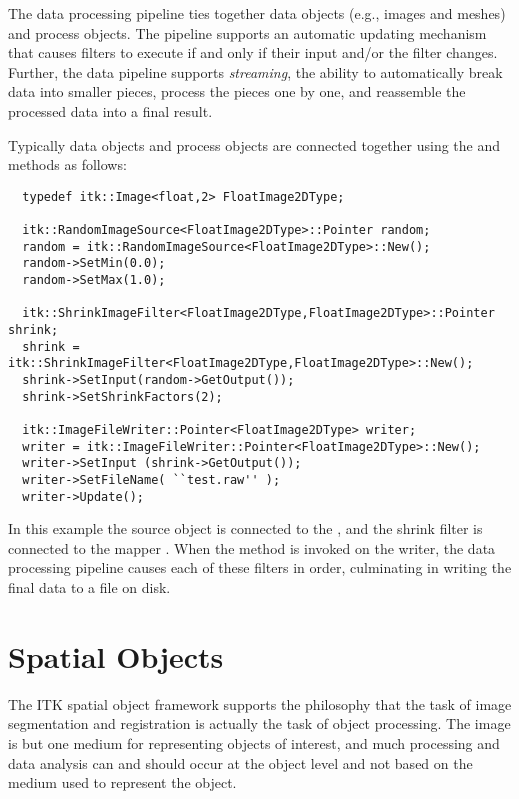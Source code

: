 
The data processing pipeline ties together data objects (e.g., images and
meshes) and process objects. The pipeline supports an automatic updating
mechanism that causes filters to execute if and only if their input 
and/or the filter changes. Further, the data pipeline supports
\emph{streaming}, the ability to automatically break data into smaller
pieces, process the pieces one by one, and reassemble the processed data into
a final result.

Typically data objects and process objects are connected together using the
 and  methods as follows:

\small
\begin{verbatim}
  typedef itk::Image<float,2> FloatImage2DType;

  itk::RandomImageSource<FloatImage2DType>::Pointer random;
  random = itk::RandomImageSource<FloatImage2DType>::New();
  random->SetMin(0.0);
  random->SetMax(1.0);

  itk::ShrinkImageFilter<FloatImage2DType,FloatImage2DType>::Pointer shrink;
  shrink = itk::ShrinkImageFilter<FloatImage2DType,FloatImage2DType>::New();
  shrink->SetInput(random->GetOutput());
  shrink->SetShrinkFactors(2);

  itk::ImageFileWriter::Pointer<FloatImage2DType> writer;
  writer = itk::ImageFileWriter::Pointer<FloatImage2DType>::New();
  writer->SetInput (shrink->GetOutput());
  writer->SetFileName( ``test.raw'' );
  writer->Update();
\end{verbatim}
\normalsize 

In this example the source object  is connected
to the , and the shrink filter is connected to
the mapper . When the  method is
invoked on the writer, the data processing pipeline causes each of these
filters in order, culminating in writing the final data to a file on disk.

%
%
%
%
\section{Spatial Objects}
\label{sec:SpatialObjects}
%
The ITK spatial object framework supports the philosophy that the task of
image segmentation and registration is actually the task of object
processing. The image is but one medium for representing objects of interest,
and much processing and data analysis can and should occur at the object
level and not based on the medium used to represent the object.


